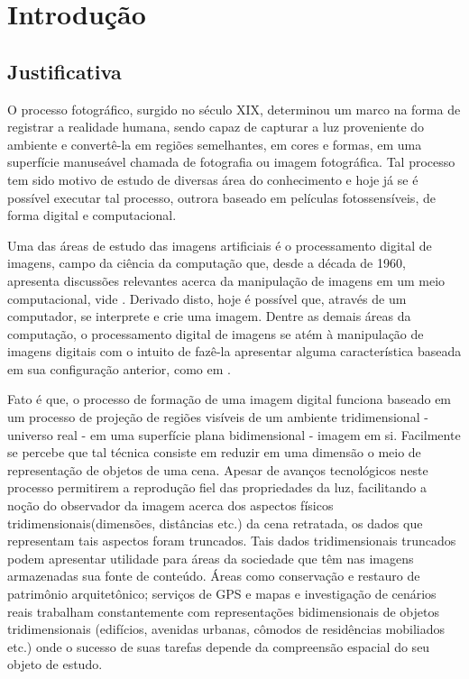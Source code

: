 \chapter{Introdução}
	\label{introducao}
	\setcounter{page}{1}

	\section{Justificativa}

	O processo fotográfico, surgido no século XIX, determinou um marco na forma de registrar a realidade humana, sendo capaz de capturar a luz proveniente do ambiente e convertê-la em regiões semelhantes, em cores e formas, em uma superfície manuseável chamada de fotografia ou imagem fotográfica. Tal processo tem sido motivo de estudo de diversas área do conhecimento e hoje já se é possível executar tal processo, outrora baseado em películas fotossensíveis, de forma digital e computacional.
	
	Uma das áreas de estudo das imagens artificiais é o processamento digital de imagens, campo da ciência da computação que, desde a década de 1960, apresenta discussões relevantes acerca da manipulação de imagens em um meio computacional, vide \cite{firstProcessingWork}. Derivado disto, hoje é possível que, através de um computador, se interprete e crie uma imagem. Dentre as demais áreas da computação, o processamento digital de imagens se atém à manipulação de imagens digitais com o intuito de fazê-la apresentar alguma característica baseada em sua configuração anterior, como em \cite{disneyProcessingExample}.
	
	Fato é que, o processo de formação de uma imagem digital funciona baseado em um processo de projeção de regiões visíveis de um ambiente tridimensional - universo real - em uma superfície plana bidimensional - imagem em si. Facilmente se percebe que tal técnica consiste em reduzir em uma dimensão o meio de representação de objetos de uma cena. Apesar de avanços tecnológicos neste processo permitirem a reprodução fiel das propriedades da luz, facilitando a noção do observador da imagem acerca  dos aspectos físicos tridimensionais(dimensões, distâncias etc.) da cena retratada, os dados que representam tais aspectos foram truncados. Tais dados tridimensionais truncados podem apresentar utilidade para áreas da sociedade que têm nas imagens armazenadas sua fonte de conteúdo. Áreas como conservação e restauro de patrimônio arquitetônico; serviços de GPS e mapas e investigação de cenários reais trabalham constantemente com representações bidimensionais de objetos tridimensionais (edifícios, avenidas urbanas, cômodos de residências mobiliados etc.) onde o sucesso de suas tarefas depende da compreensão espacial do seu objeto de estudo.
	

